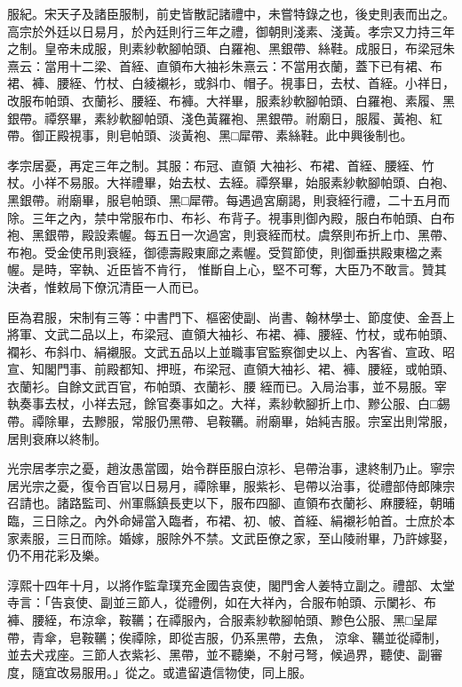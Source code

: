 \begin{pinyinscope}
 服紀。宋天子及諸臣服制，前史皆散記諸禮中，未嘗特錄之也，後史則表而出之。高宗於外廷以日易月，於內廷則行三年之禮，御朝則淺素、淺黃。孝宗又力持三年
 之制。皇帝未成服，則素紗軟腳帕頭、白羅袍、黑銀帶、絲鞋。成服日，布梁冠朱熹云：當用十二梁、首絰、直領布大袖衫朱熹云：不當用衣蘭，蓋下已有裙、布裙、褲、腰絰、竹杖、白綾襯衫，或斜巾、帽子。視事日，去杖、首絰。小祥日，改服布帕頭、衣蘭衫、腰絰、布褲。大祥畢，服素紗軟腳帕頭、白羅袍、素履、黑銀帶。禫祭畢，素紗軟腳帕頭、淺色黃羅袍、黑銀帶。祔廟日，服履、黃袍、紅帶。御正殿視事，則皂帕頭、淡黃袍、黑□犀帶、素絲鞋。此中興後制也。



 孝宗居憂，再定三年之制。其服：布冠、直領
 大袖衫、布裙、首絰、腰絰、竹杖。小祥不易服。大祥禮畢，始去杖、去絰。禫祭畢，始服素紗軟腳帕頭、白袍、黑銀帶。祔廟畢，服皂帕頭、黑□犀帶。每遇過宮廟謁，則衰絰行禮，二十五月而除。三年之內，禁中常服布巾、布衫、布背子。視事則御內殿，服白布帕頭、白布袍、黑銀帶，殿設素幄。每五日一次過宮，則衰絰而杖。虞祭則布折上巾、黑帶、布袍。受金使吊則衰絰，御德壽殿東廊之素幄。受賀節使，則御垂拱殿東楹之素幄。是時，宰執、近臣皆不肯行，
 惟斷自上心，堅不可奪，大臣乃不敢言。贊其決者，惟敕局下僚沉清臣一人而已。



 臣為君服，宋制有三等：中書門下、樞密使副、尚書、翰林學士、節度使、金吾上將軍、文武二品以上，布梁冠、直領大袖衫、布裙、褲、腰絰、竹杖，或布帕頭、襴衫、布斜巾、絹襯服。文武五品以上並職事官監察御史以上、內客省、宣政、昭宣、知閣門事、前殿都知、押班，布梁冠、直領大袖衫、裙、褲、腰絰，或帕頭、衣蘭衫。自餘文武百官，布帕頭、衣蘭衫、腰
 絰而已。入局治事，並不易服。宰執奏事去杖，小祥去冠，餘官奏事如之。大祥，素紗軟腳折上巾、黲公服、白□錫帶。禫除畢，去黲服，常服仍黑帶、皂鞍韉。祔廟畢，始純吉服。宗室出則常服，居則衰麻以終制。



 光宗居孝宗之憂，趙汝愚當國，始令群臣服白涼衫、皂帶治事，逮終制乃止。寧宗居光宗之憂，復令百官以日易月，禫除畢，服紫衫、皂帶以治事，從禮部侍郎陳宗召請也。諸路監司、州軍縣鎮長吏以下，服布四腳、直領布衣蘭衫、麻腰絰，朝晡
 臨，三日除之。內外命婦當入臨者，布裙、初、帔、首絰、絹襯衫帕首。士庶於本家素服，三日而除。婚嫁，服除外不禁。文武臣僚之家，至山陵祔畢，乃許嫁娶，仍不用花彩及樂。



 淳熙十四年十月，以將作監韋璞充金國告哀使，閣門舍人姜特立副之。禮部、太堂寺言：「告哀使、副並三節人，從禮例，如在大祥內，合服布帕頭、示闌衫、布褲、腰絰，布涼傘，鞍韉；在禫服內，合服素紗軟腳帕頭、黲色公服、黑□呈犀帶，青傘，皂鞍韉；俟禫除，即從吉服，仍系黑帶，去魚，
 涼傘、韉並從禫制，並去犬戎座。三節人衣紫衫、黑帶，並不聽樂，不射弓弩，候過界，聽使、副審度，隨宜改易服用。」從之。或遣留遺信物使，同上服。




\end{pinyinscope}
